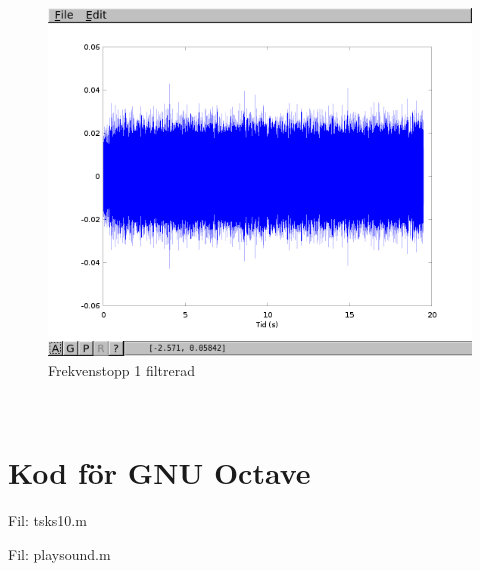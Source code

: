 \documentclass[10pt]{article}
\begin{document}
\begin{figure}[htp]
  \begin{center}
  \includegraphics[keepaspectratio=true,width=\linewidth]{topp3_filter.png}  %
  \end{center}
  \caption{Frekvenstopp 1 filtrerad} %
  \label{fig:topp3_filter}
\end{figure}

\newpage
~\\
\newpage
\section{Kod för GNU Octave}

Fil: tsks10.m



\newpage

Fil: playsound.m


\end{document}
